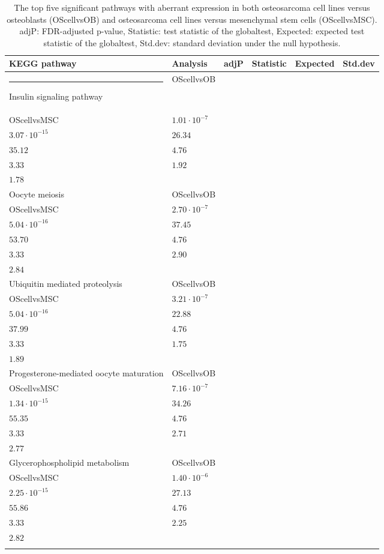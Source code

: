 \begin{myTable}
		\begin{longtable}[c]{|>{\raggedright}p{1.55in} >{\raggedright}p{0.95in} >{\raggedright}p{0.85in} >{\raggedright}p{0.6in} >{\raggedright}p{0.6in} >{\raggedright}p{0.53in}|}
		\hline
		KEGG pathway & Analysis & adjP & Statistic & Expected & Std.dev\tabularnewline
		\hline
		\rule{-2.5pt}{1ex} Insulin signaling pathway & OScellvsOB \\ OScellvsMSC & $1.01\cdot10^{-7}$ \\ $3.07\cdot10^{-15}$ & $26.34$ \\ $35.12$ & $4.76$ \\ $3.33$ & $1.92$ \\ $1.78$\tabularnewline
		Oocyte meiosis & OScellvsOB \\ OScellvsMSC & $2.70\cdot10^{-7}$ \\ $5.04\cdot10^{-16}$ & $37.45$ \\ $53.70$ & $4.76$ \\ $3.33$ & $2.90$ \\ $2.84$\tabularnewline
		Ubiquitin mediated proteolysis & OScellvsOB \\ OScellvsMSC & $3.21\cdot10^{-7}$ \\ $5.04\cdot10^{-16}$ & $22.88$ \\ $37.99$ & $4.76$ \\ $3.33$ & $1.75$ \\ $1.89$\tabularnewline
		Progesterone-mediated oocyte maturation & OScellvsOB \\ OScellvsMSC & $7.16\cdot10^{-7}$ \\ $1.34\cdot10^{-15}$ & $34.26$ \\ $55.35$ & $4.76$ \\ $3.33$ & $2.71$ \\ $2.77$\tabularnewline
		Glycerophospholipid metabolism & OScellvsOB \\ OScellvsMSC & $1.40\cdot10^{-6}$ \\ $2.25\cdot10^{-15}$ & $27.13$ \\ $55.86$ & $4.76$ \\ $3.33$ & $2.25$ \\ $2.82$\tabularnewline
		\hline
		\caption{The top five significant pathways with aberrant expression in both osteosarcoma cell lines versus osteoblasts (OScellvsOB) and osteosarcoma cell lines versus mesenchymal stem cells (OScellvsMSC). adjP: FDR\hyp{}adjusted p-value, Statistic: test statistic of the globaltest, Expected: expected test statistic of the globaltest, Std.dev: standard deviation under the null hypothesis.}
		\label{tab5.1}
		\end{longtable}
\end{myTable}
